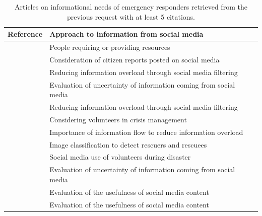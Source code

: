 \begin{table}[bht]
    \centering
    \tabulinesep=1.2mm
    \caption{Articles on informational needs of emergency responders retrieved from the previous request with at least 5 citations.}
    \begin{tabu} to \textwidth {X[1,m]X[3,m]}
        Reference                                             & Approach to information from social media                         \\ [0.5ex]
        \toprule
        \textcite{cobbDesigningDelugeUnderstanding2014}       & People requiring or providing resources                           \\
        \textcite{graceCommunityCoordinationAligning2018}     & Consideration of citizen reports posted on social media           \\
        \textcite{kaufholdMitigatingInformationOverload2020}  & Reducing information overload through social media filtering      \\
        \textcite{mehtaTrustVerifySocial2017}                 & Evaluation of uncertainty of information coming from social media \\
        \textcite{moiStrategyProcessingAnalyzing2016}         & Reducing information overload through social media filtering      \\
        \textcite{nielsenEmbracingIntegratingSpontaneous2019} & Considering volunteers in crisis management                       \\
        \textcite{norri-sederholmEnsuringInformationFlow2017} & Importance of information flow to reduce information overload     \\
        \textcite{onealTrainingEmergencyresponseImage2019}    & Image classification to detect rescuers and rescuees              \\
        \textcite{smithSocialMediaCitizenled2018}             & Social media use of volunteers during disaster                    \\
        \textcite{tapiaGoodEnoughGood2014}                    & Evaluation of uncertainty of information coming from social media \\
        \textcite{tapiaTrustworthyTweetDeeper2013}            & Evaluation of the usefulness of social media content              \\
        \textcite{vangorpJustKeepTweeting2015}                & Evaluation of the usefulness of social media content              \\
        \bottomrule
    \end{tabu}
    \label{table:business-needs-social-media}
\end{table}

